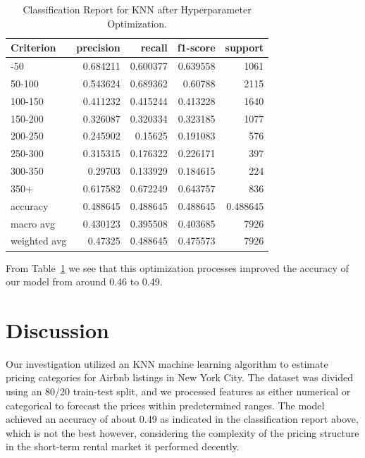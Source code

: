 \documentclass[
  letterpaper,
  DIV=11,
  numbers=noendperiod]{scrartcl}
\begin{document}
\begin{longtable}[]{@{}lrrrr@{}}

\caption{\label{tbl-hyperparam-clf}Classification Report for KNN after
Hyperparameter Optimization.}

\tabularnewline

\toprule\noalign{}
Criterion & precision & recall & f1-score & support \\
\midrule\noalign{}
\endhead
\bottomrule\noalign{}
\endlastfoot
0-50 & 0.684211 & 0.600377 & 0.639558 & 1061 \\
50-100 & 0.543624 & 0.689362 & 0.60788 & 2115 \\
100-150 & 0.411232 & 0.415244 & 0.413228 & 1640 \\
150-200 & 0.326087 & 0.320334 & 0.323185 & 1077 \\
200-250 & 0.245902 & 0.15625 & 0.191083 & 576 \\
250-300 & 0.315315 & 0.176322 & 0.226171 & 397 \\
300-350 & 0.29703 & 0.133929 & 0.184615 & 224 \\
350+ & 0.617582 & 0.672249 & 0.643757 & 836 \\
accuracy & 0.488645 & 0.488645 & 0.488645 & 0.488645 \\
macro avg & 0.430123 & 0.395508 & 0.403685 & 7926 \\
weighted avg & 0.47325 & 0.488645 & 0.475573 & 7926 \\

\end{longtable}

From Table~\ref{tbl-hyperparam-clf} we see that this optimization
processes improved the accuracy of our model from around 0.46 to 0.49.

\section{Discussion}\label{discussion}

Our investigation utilized an KNN machine learning algorithm to estimate
pricing categories for Airbnb listings in New York City. The dataset was
divided using an 80/20 train-test split, and we processed features as
either numerical or categorical to forecast the prices within
predetermined ranges. The model achieved an accuracy of about 0.49 as
indicated in the classification report above, which is not the best
however, considering the complexity of the pricing structure in the
short-term rental market it performed decently.
\end{document}

